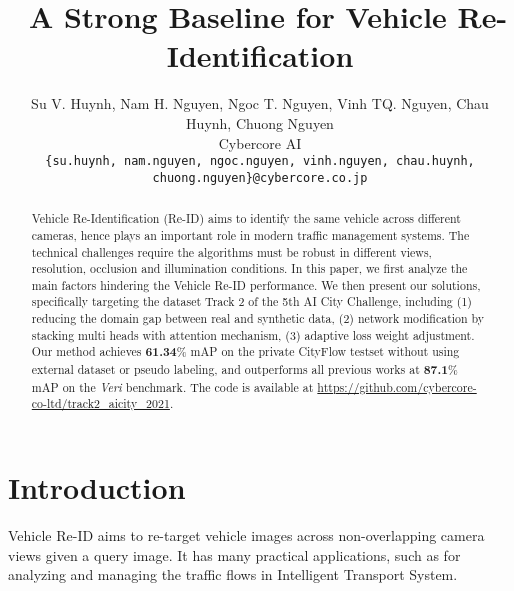 \documentclass[10pt,twocolumn,letterpaper]{article}
\begin{document}
\title{\ A Strong Baseline for Vehicle Re-Identification}

\author{Su V. Huynh, Nam H. Nguyen, Ngoc T. Nguyen, Vinh TQ. Nguyen, Chau Huynh, Chuong Nguyen\\
Cybercore AI\\
{\tt\small \{su.huynh, nam.nguyen, ngoc.nguyen, vinh.nguyen, chau.huynh, chuong.nguyen\}@cybercore.co.jp}
}

\maketitle
\ificcvfinal\thispagestyle{empty}\fi

\begin{abstract}
Vehicle Re-Identification (Re-ID) aims to identify the same vehicle across different cameras, hence plays an important role in modern traffic management systems. The technical challenges require the algorithms must be robust in different views, resolution, occlusion and illumination conditions. In this paper, we first analyze the main factors hindering the Vehicle Re-ID performance. We then present our solutions, specifically targeting the dataset Track 2 of the 5th AI City Challenge, including (1) reducing the domain gap between real and synthetic data, (2) network modification by stacking multi heads with attention mechanism, (3) adaptive loss weight adjustment. Our method achieves \textbf{61.34}\% mAP on the private CityFlow testset without using external dataset or pseudo labeling, and outperforms all previous works at \textbf{87.1}\% mAP on the \textit{Veri} benchmark. The code is available at 
 \url{https://github.com/cybercore-co-ltd/track2_aicity_2021}.

\end{abstract}
\section{Introduction}


Vehicle Re-ID aims to re-target vehicle images across non-overlapping camera views given a query image. It has many practical applications, such as for analyzing and managing the traffic flows in Intelligent Transport System.
\end{document}
